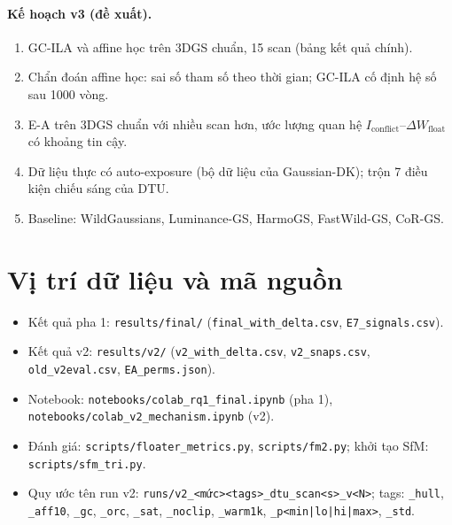 \documentclass[11pt,a4paper]{article}
\newcommand{\dW}{\Delta W_{\text{float}}}
\begin{document}
\paragraph{Kế hoạch v3 (đề xuất).}
\begin{enumerate}
  \item GC-ILA và affine học trên 3DGS chuẩn, 15 scan (bảng kết quả chính).
  \item Chẩn đoán affine học: sai số tham số theo thời gian; GC-ILA cố định hệ số sau 1000 vòng.
  \item E-A trên 3DGS chuẩn với nhiều scan hơn, ước lượng quan hệ $I_{\text{conflict}}$--$\dW$ có khoảng tin cậy.
  \item Dữ liệu thực có auto-exposure (bộ dữ liệu của Gaussian-DK); trộn 7 điều kiện chiếu sáng của DTU.
  \item Baseline: WildGaussians, Luminance-GS, HarmoGS, FastWild-GS, CoR-GS.
\end{enumerate}

\appendix
\section{Vị trí dữ liệu và mã nguồn}
\sloppy
\begin{itemize}
  \item Kết quả pha 1: \texttt{results/final/} (\texttt{final\_with\_delta.csv}, \texttt{E7\_signals.csv}).
  \item Kết quả v2: \texttt{results/v2/} (\texttt{v2\_with\_delta.csv}, \texttt{v2\_snaps.csv}, \texttt{old\_v2eval.csv}, \texttt{EA\_perms.json}).
  \item Notebook: \texttt{notebooks/colab\_rq1\_final.ipynb} (pha 1), \texttt{notebooks/colab\_v2\_mechanism.ipynb} (v2).
  \item Đánh giá: \texttt{scripts/floater\_metrics.py}, \texttt{scripts/fm2.py}; khởi tạo SfM: \texttt{scripts/sfm\_tri.py}.
  \item Quy ước tên run v2: \texttt{runs/v2\_<mức><tags>\_dtu\_scan<s>\_v<N>}; tags: \texttt{\_hull}, \texttt{\_aff10}, \texttt{\_gc}, \texttt{\_orc}, \texttt{\_sat}, \texttt{\_noclip}, \texttt{\_warm1k}, \texttt{\_p<min|lo|hi|max>}, \texttt{\_std}.
\end{itemize}
\end{document}
